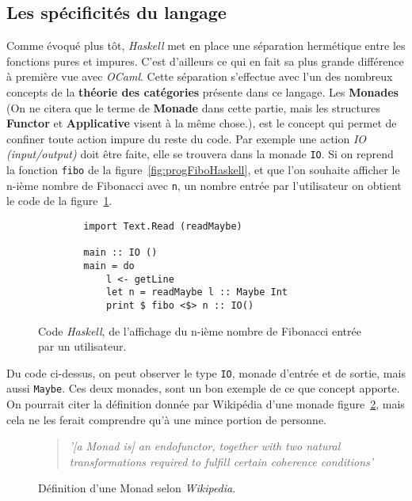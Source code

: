 \subsection{Les spécificités du langage}

Comme évoqué plus tôt, \textit{Haskell} met en place une séparation 
hermétique entre les fonctions pures et impures. C'est d'ailleurs ce qui en fait 
sa plus grande différence à première vue avec \textit{OCaml}. Cette séparation
s'effectue avec l'un des nombreux concepts de la \textbf{théorie des catégories}
présente dans ce langage. Les \textbf{Monades} (On ne citera que le terme de 
\textbf{Monade} dans cette partie, mais les structures \textbf{Functor} et 
\textbf{Applicative} visent à la même chose.), est le concept qui permet de 
confiner toute action impure du reste du code. Par exemple 
une action \textit{IO (input/output)} doit être faite, elle se trouvera dans la 
monade \texttt{IO}. Si on reprend la fonction 
\texttt{fibo} de la figure~\ref{fig:progFiboHaskell}, et que l'on 
souhaite afficher le n-ième nombre de Fibonacci avec \texttt{n}, un 
nombre entrée par l'utilisateur on obtient le code de la 
figure~\ref{fig:progInOutFibo}.

\begin{figure}[H]
    \begin{verbatim}
        import Text.Read (readMaybe)
        
        main :: IO ()
        main = do
            l <- getLine
            let n = readMaybe l :: Maybe Int
            print $ fibo <$> n :: IO()
    \end{verbatim}
    \caption{
        Code \textit{Haskell}, de l'affichage du n-ième nombre de Fibonacci
        entrée par un utilisateur.
    }\label{fig:progInOutFibo}
\end{figure}

Du code ci-dessus, on peut observer le type \texttt{IO}, monade 
d'entrée et de sortie, mais aussi \texttt{Maybe}. Ces deux monades,
sont un bon exemple de ce que concept apporte. On pourrait citer la définition 
donnée par Wikipédia d'une monade figure~\ref{fig:citationMonad}, mais cela ne 
les ferait comprendre qu'à une mince portion de personne.

\begin{figure}[H]
    \begin{quotation}
        \textit{'[a Monad is] an endofunctor, together with two natural 
        transformations required to fulfill certain coherence conditions'
        }\cite{citationMonadWiki}
    \caption{
      Définition d'une Monad selon \textit{Wikipedia}.
    }\label{fig:citationMonad}
    \end{quotation}
\end{figure}


